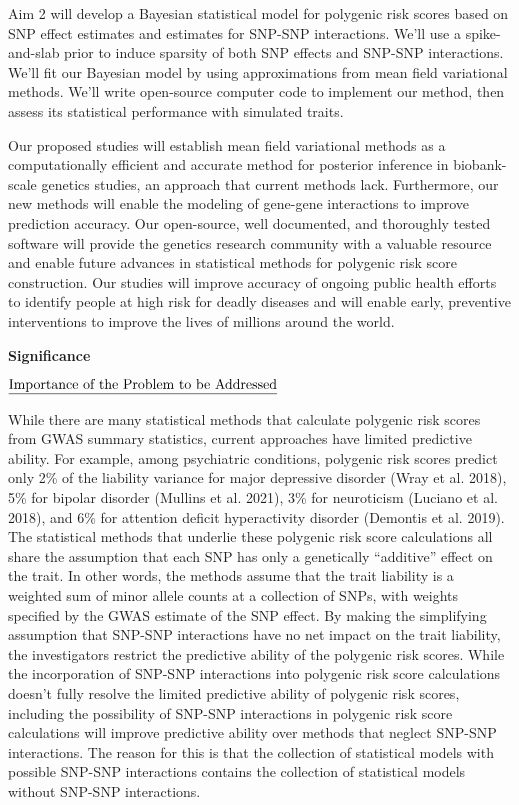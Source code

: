 \documentclass[
  11pt,
  letterpaper,
  DIV=11,
  numbers=noendperiod]{scrartcl}
\begin{document}
Aim 2 will develop a Bayesian statistical model for polygenic risk
scores based on SNP effect estimates and estimates for SNP-SNP
interactions. We'll use a spike-and-slab prior to induce sparsity of
both SNP effects and SNP-SNP interactions. We'll fit our Bayesian model
by using approximations from mean field variational methods. We'll write
open-source computer code to implement our method, then assess its
statistical performance with simulated traits.

Our proposed studies will establish mean field variational methods as a
computationally efficient and accurate method for posterior inference in
biobank-scale genetics studies, an approach that current methods lack.
Furthermore, our new methods will enable the modeling of gene-gene
interactions to improve prediction accuracy. Our open-source, well
documented, and thoroughly tested software will provide the genetics
research community with a valuable resource and enable future advances
in statistical methods for polygenic risk score construction. Our
studies will improve accuracy of ongoing public health efforts to
identify people at high risk for deadly diseases and will enable early,
preventive interventions to improve the lives of millions around the
world.

\textbf{Significance}

\(\text{\underline{Importance of the Problem to be Addressed}}\)

While there are many statistical methods that calculate polygenic risk
scores from GWAS summary statistics, current approaches have limited
predictive ability. For example, among psychiatric conditions, polygenic
risk scores predict only 2\% of the liability variance for major
depressive disorder (Wray et al. 2018), 5\% for bipolar disorder
(Mullins et al. 2021), 3\% for neuroticism (Luciano et al. 2018), and
6\% for attention deficit hyperactivity disorder (Demontis et al. 2019).
The statistical methods that underlie these polygenic risk score
calculations all share the assumption that each SNP has only a
genetically ``additive'' effect on the trait. In other words, the
methods assume that the trait liability is a weighted sum of minor
allele counts at a collection of SNPs, with weights specified by the
GWAS estimate of the SNP effect. By making the simplifying assumption
that SNP-SNP interactions have no net impact on the trait liability, the
investigators restrict the predictive ability of the polygenic risk
scores. While the incorporation of SNP-SNP interactions into polygenic
risk score calculations doesn't fully resolve the limited predictive
ability of polygenic risk scores, including the possibility of SNP-SNP
interactions in polygenic risk score calculations will improve
predictive ability over methods that neglect SNP-SNP interactions. The
reason for this is that the collection of statistical models with
possible SNP-SNP interactions contains the collection of statistical
models without SNP-SNP interactions.
\end{document}
